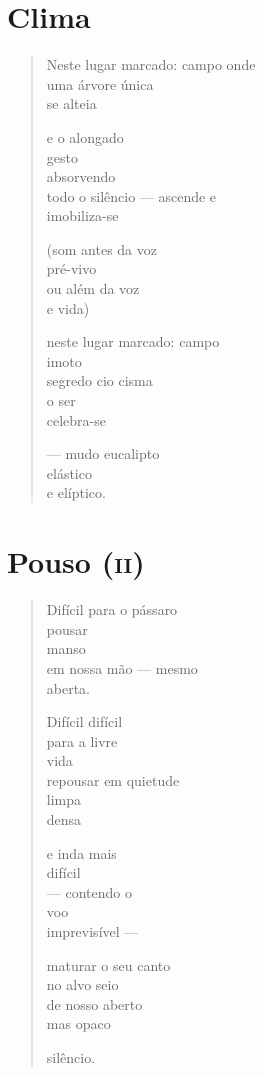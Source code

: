 \chapter{Clima}

\begin{verse}
Neste lugar marcado: campo onde\\
uma árvore única\\
se alteia

e o alongado\\
gesto\\
absorvendo\\
todo o silêncio --- ascende e\\
\qquad\qquad imobiliza-se

(som antes da voz\\
pré-vivo\\
ou além da voz\\
e vida)

neste lugar marcado: campo\\
\qquad\qquad imoto\\
segredo \quad cio \quad cisma\\
o ser\\
celebra-se

--- mudo eucalipto\\
\quad elástico\\
\quad e elíptico.
\end{verse}

\chapter{Pouso (\textsc{ii})}

\begin{verse}
Difícil para o pássaro\\
\qquad\qquad pousar\\
\qquad\qquad manso\\
em nossa mão --- mesmo\\
\qquad\qquad aberta.

Difícil difícil\\
para a livre\\
\qquad vida\\
repousar em quietude\\
\qquad\qquad limpa\\
\qquad\qquad densa

e inda mais\\
\qquad difícil\\
--- contendo o\\
\qquad voo\\
imprevisível ---

maturar o seu canto\\
no alvo seio\\
de nosso aberto\\
mas opaco

silêncio.
\end{verse}

